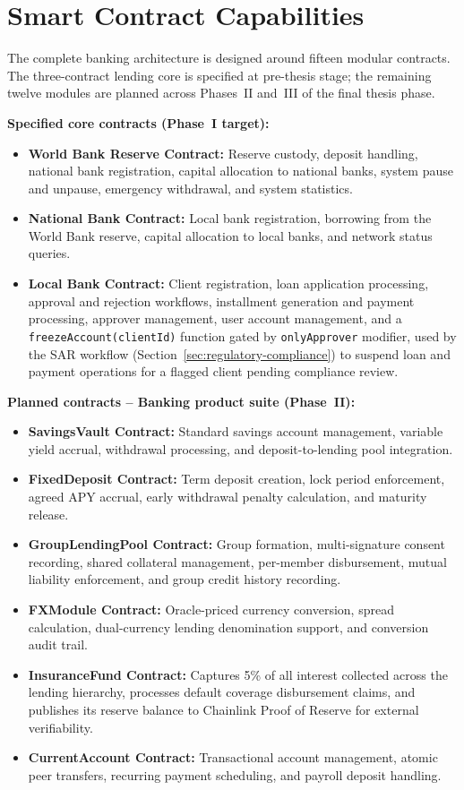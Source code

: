 \documentclass[12pt, a4paper]{report}
\begin{document}
\vspace{2pt}

\chapter{Smart Contract Capabilities}

The complete banking architecture is designed around fifteen modular contracts. The three-contract lending core is specified at pre-thesis stage; the remaining twelve modules are planned across Phases~II and~III of the final thesis phase.

\textbf{Specified core contracts (Phase~I target):}
\begin{itemize}[noitemsep]
\item \textbf{World Bank Reserve Contract:} Reserve custody, deposit handling, national bank registration, capital allocation to national banks, system pause and unpause, emergency withdrawal, and system statistics.
\item \textbf{National Bank Contract:} Local bank registration, borrowing from the World Bank reserve, capital allocation to local banks, and network status queries.
\item \textbf{Local Bank Contract:} Client registration, loan application processing, approval and rejection workflows, installment generation and payment processing, approver management, user account management, and a \texttt{freezeAccount(clientId)} function gated by \texttt{onlyApprover} modifier, used by the SAR workflow (Section~\ref{sec:regulatory-compliance}) to suspend loan and payment operations for a flagged client pending compliance review.
\end{itemize}

\textbf{Planned contracts -- Banking product suite (Phase~II):}
\begin{itemize}[noitemsep]
\item \textbf{SavingsVault Contract:} Standard savings account management, variable yield accrual, withdrawal processing, and deposit-to-lending pool integration.
\item \textbf{FixedDeposit Contract:} Term deposit creation, lock period enforcement, agreed APY accrual, early withdrawal penalty calculation, and maturity release.
\item \textbf{GroupLendingPool Contract:} Group formation, multi-signature consent recording, shared collateral management, per-member disbursement, mutual liability enforcement, and group credit history recording.
\item \textbf{FXModule Contract:} Oracle-priced currency conversion, spread calculation, dual-currency lending denomination support, and conversion audit trail.
\item \textbf{InsuranceFund Contract:} Captures 5\% of all interest collected across the lending hierarchy, processes default coverage disbursement claims, and publishes its reserve balance to Chainlink Proof of Reserve for external verifiability.
\item \textbf{CurrentAccount Contract:} Transactional account management, atomic peer transfers, recurring payment scheduling, and payroll deposit handling.
\end{itemize}
\end{document}
